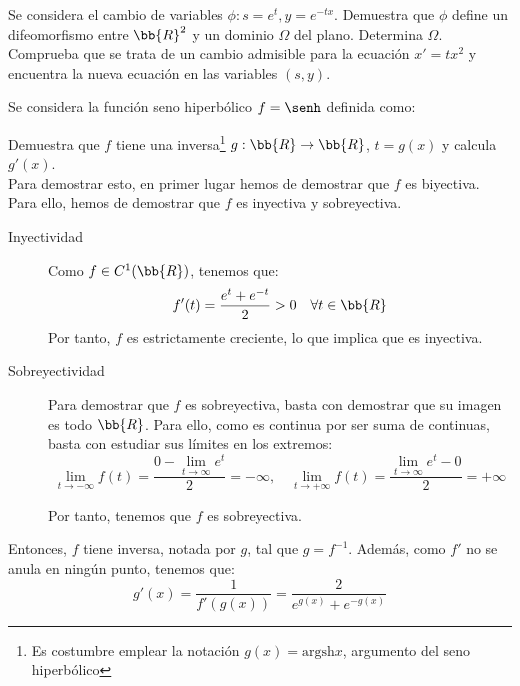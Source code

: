 \documentclass[12pt]{article}
\begin{document}
    \begin{ejercicio}
        Se considera el cambio de variables $\phi : s = e^t, y = e^{-tx}$. Demuestra que $\phi$ define un difeomorfismo entre $\bb{R}^2$ y un dominio $\Omega$ del plano.
        Determina $\Omega$.
        Comprueba que se trata de un cambio admisible para la ecuación $x' = tx^2$ y encuentra la nueva ecuación en las variables $(s,y)$.
    \end{ejercicio}

    \begin{ejercicio}
        Se considera la función seno hiperbólico $f=\senh$ definida como:

        Demuestra que $f$ tiene una inversa\footnote{Es costumbre emplear la notación $g(x) = \text{argsh} x$, argumento del seno hiperbólico} $g:\bb{R}\to\bb{R}$, $t=g(x)$ y calcula $g'(x)$.\\

        Para demostrar esto, en primer lugar hemos de demostrar que $f$ es biyectiva. Para ello, hemos de demostrar que $f$ es inyectiva y sobreyectiva.
        \begin{description}
            \item[Inyectividad] Como $f\in C^1(\bb{R})$, tenemos que:
            \begin{equation*}
                f'(t) = \dfrac{e^t+e^{-t}}{2} > 0 \quad \forall t\in \bb{R}
            \end{equation*} 
            Por tanto, $f$ es estrictamente creciente, lo que implica que es inyectiva.

            \item[Sobreyectividad] Para demostrar que $f$ es sobreyectiva, basta con demostrar que su imagen es todo $\bb{R}$. Para ello, como es continua por ser suma de continuas, basta con estudiar sus límites en los extremos:
            \begin{equation*}
                \lim_{t\to -\infty} f(t) = \dfrac{0-\lim_{t\to \infty}e^{t}}{2} = -\infty, \quad \lim_{t\to +\infty} f(t) = \dfrac{\lim_{t\to \infty}e^{t}-0}{2} = +\infty
            \end{equation*}

            Por tanto, tenemos que $f$ es sobreyectiva.
        \end{description}
        Entonces, $f$ tiene inversa, notada por $g$, tal que $g=f^{-1}$.
        Además, como $f'$ no se anula en ningún punto, tenemos que:
        \begin{equation*}
            g'(x) = \dfrac{1}{f'(g(x))}
            = \dfrac{2}{e^{g(x)}+e^{-g(x)}}
        \end{equation*}
    \end{ejercicio}
\end{document}
